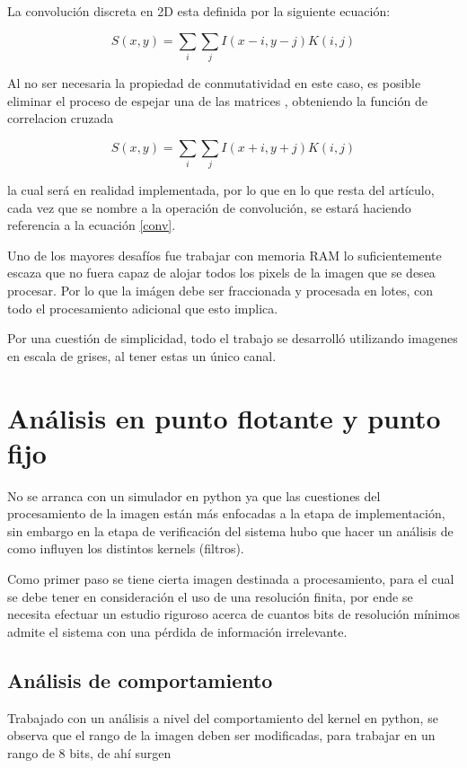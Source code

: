 \documentclass[conference,compsoc]{IEEEtran}
\begin{document}
La convoluci\'on discreta en 2D esta definida por la siguiente
ecuaci\'on: 

\begin{equation}\label{conv-org}
S(x,y) = \sum_{i} \sum_{j}I(x-i,y-j)K(i, j)
\end{equation}

Al no ser necesaria la propiedad de conmutatividad en este caso, es posible
eliminar el proceso de espejar una de las matrices\cite{Goodfellow-et-al-2016} ,
obteniendo la funci\'on de correlacion cruzada

\begin{equation}\label{conv}
S(x,y) = \sum_{i} \sum_{j}I(x+i,y+j)K(i, j)
\end{equation}

la cual ser\'a en realidad  implementada, por lo que en lo que resta
del art\'iculo, cada vez que se nombre a la operaci\'on de convoluci\'on,
se estar\'a haciendo referencia a la ecuaci\'on \ref{conv}.

Uno de los mayores desaf\'ios fue trabajar con memoria RAM lo suficientemente
escaza que no fuera capaz de alojar todos los pixels de la imagen que se desea
procesar. Por lo que la im\'agen debe ser fraccionada y procesada en lotes, con
todo el procesamiento adicional que esto implica.

Por una cuesti\'on de simplicidad, todo el trabajo se desarroll\'o utilizando
imagenes en escala de grises, al tener estas un \'unico canal.


\section{An\'alisis en punto flotante y punto fijo}
No se arranca con un simulador en python ya que las cuestiones del procesamiento
de la imagen est\'an m\'as enfocadas a la etapa de implementaci\'on, sin embargo en la
etapa de verificaci\'on del sistema hubo que hacer un an\'alisis de como influyen
los distintos kernels (filtros).

Como primer paso se tiene cierta imagen destinada a procesamiento, para el cual se debe
tener en consideración el uso de una resolución finita, por ende se necesita efectuar un estudio
riguroso acerca de cuantos bits de resoluci\'on m\'inimos admite el sistema con una p\'erdida
de informaci\'on irrelevante.

\subsection{An\'alisis de comportamiento}
Trabajado con un an\'alisis a nivel del comportamiento del kernel en python, se
observa que el rango de la imagen deben ser modificadas,  para trabajar en un
rango de 8 bits, de ahí surgen
\end{document}
